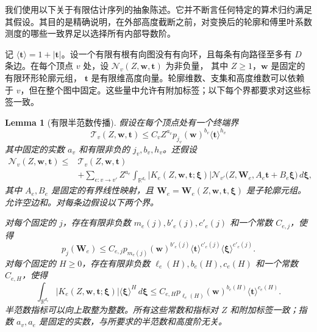 \documentclass[11pt,a4paper]{article}
\numberwithin{equation}{section}
\numberwithin{figure}{section}
\newtheorem{lemma}[theorem]{Lemma}
\theoremstyle{definition}
\theoremstyle{remark}
\begin{document}
我们使用以下关于有限估计序列的抽象陈述。它并不断言任何特定的算术归约满足其假设。其目的是精确说明，在外部高度截断之前，对变换后的轮廓和傅里叶系数测度的哪些一致界足以选择所有内部导数阶。

记 $\langle\boldsymbol t\rangle=1+|\boldsymbol t|$。设一个有限有根有向图没有有向环，且每条有向路径至多有 $D$ 条边。在每个顶点 $v$ 处，设
$\mathcal N_v(Z,\boldsymbol w,\boldsymbol t)$ 为非负量，
其中 $Z\ge1$，$\boldsymbol w$ 是固定的有限环形轮廓元组，
$\boldsymbol t$ 是有限维高度向量。轮廓维数、支集和高度维数可以依赖于 $v$，但在整个图中固定。这些量中允许有附加标签；以下每个界都要求对这些标签一致。

\begin{lemma}[有限半范数传播]\label{lem:finite-seminorm-propagation}
假设在每个顶点处有一个终端界
\[
 \mathcal T_v(Z,\boldsymbol w,\boldsymbol t)
 \le C_v Z^{a_v}p_{j_v}(\boldsymbol w)^{b_v}
                   \langle\boldsymbol t\rangle^{h_v}
\]
其中固定的实数 $a_v$ 和有限非负的 $j_v,b_v,h_v$。还假设
\[
 \begin{split}
 \mathcal N_v(Z,\boldsymbol w,\boldsymbol t)
 \le{}&\mathcal T_v(Z,\boldsymbol w,\boldsymbol t)\\
 &+\sum_{e:v\to v'}Z^{a_e}\int_{\mathbb R^{d_e}}
 |K_e(Z,\boldsymbol w,\boldsymbol t;\boldsymbol\xi)|
 \mathcal N_{v'}\bigl(Z,\boldsymbol W_e,
       A_e\boldsymbol t+B_e\boldsymbol\xi\bigr)\,d\boldsymbol\xi,
 \end{split}
\]
其中 $A_e,B_e$ 是固定的有界线性映射，且
$\boldsymbol W_e=\boldsymbol W_e(Z,\boldsymbol w,\boldsymbol t,
\boldsymbol\xi)$ 是子轮廓元组。允许空边和。对每条边假设以下两个界。

对每个固定的 $j$，存在有限非负数
$m_e(j),b'_e(j),c'_e(j)$ 和一个常数 $C_{e,j}$，使得
\[
 p_j(\boldsymbol W_e)
 \le C_{e,j}p_{m_e(j)}(\boldsymbol w)^{b'_e(j)}
       \langle\boldsymbol t\rangle^{c'_e(j)}
       \langle\boldsymbol\xi\rangle^{c'_e(j)}.
\]
对每个固定的 $H\ge0$，存在有限非负数
$\ell_e(H),b_e(H),c_e(H)$ 和一个常数 $C_{e,H}$，使得
\[
 \int_{\mathbb R^{d_e}}|K_e(Z,\boldsymbol w,\boldsymbol t;
            \boldsymbol\xi)|\langle\boldsymbol\xi\rangle^H
                         \,d\boldsymbol\xi
 \le C_{e,H}p_{\ell_e(H)}(\boldsymbol w)^{b_e(H)}
                 \langle\boldsymbol t\rangle^{c_e(H)}.
\]
半范数指标可以向上取整为整数。所有这些常数和指标对 $Z$ 和附加标签一致；指数 $a_v,a_e$ 是固定的实数，与所要求的半范数和高度阶无关。


\end{lemma}
\end{document}
